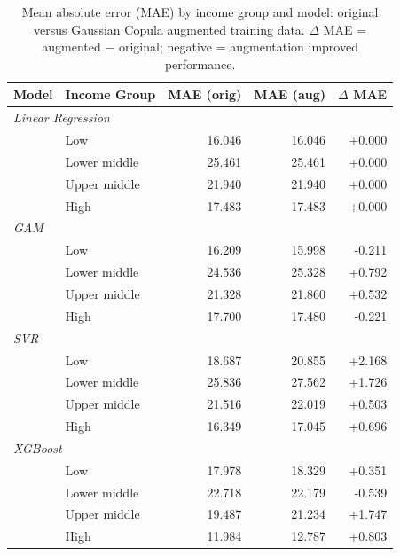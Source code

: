 \begin{table}
    \caption{Mean absolute error (MAE) by income group and model: 
             original versus Gaussian Copula augmented training data.
             $\Delta$ MAE = augmented $-$ original; negative = augmentation improved performance.}
    \label{tab:sq2_aug_comparison}
    \centering
    \small
    \begin{tabular}{llrrr}
        \toprule
        Model & Income Group & MAE (orig) & MAE (aug) & $\Delta$ MAE \\
        \midrule
        \multicolumn{5}{l}{\textit{Linear Regression}} \\
        & Low & 16.046 & 16.046 & +0.000 \\
        & Lower middle & 25.461 & 25.461 & +0.000 \\
        & Upper middle & 21.940 & 21.940 & +0.000 \\
        & High & 17.483 & 17.483 & +0.000 \\
        \midrule
        \multicolumn{5}{l}{\textit{GAM}} \\
        & Low & 16.209 & 15.998 & -0.211 \\
        & Lower middle & 24.536 & 25.328 & +0.792 \\
        & Upper middle & 21.328 & 21.860 & +0.532 \\
        & High & 17.700 & 17.480 & -0.221 \\
        \midrule
        \multicolumn{5}{l}{\textit{SVR}} \\
        & Low & 18.687 & 20.855 & +2.168 \\
        & Lower middle & 25.836 & 27.562 & +1.726 \\
        & Upper middle & 21.516 & 22.019 & +0.503 \\
        & High & 16.349 & 17.045 & +0.696 \\
        \midrule
        \multicolumn{5}{l}{\textit{XGBoost}} \\
        & Low & 17.978 & 18.329 & +0.351 \\
        & Lower middle & 22.718 & 22.179 & -0.539 \\
        & Upper middle & 19.487 & 21.234 & +1.747 \\
        & High & 11.984 & 12.787 & +0.803 \\
                \bottomrule
    \end{tabular}
\end{table}
